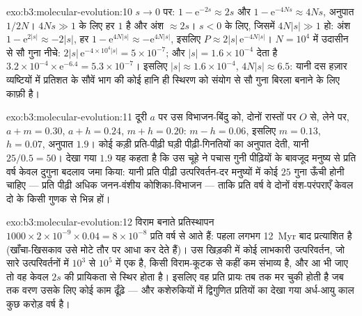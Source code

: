 \begin{solution}{exo:b3:molecular-evolution:10}
$s \to 0$ पर: $1 - \mathrm{e}^{-2s} \approx 2s$ और $1 - \mathrm{e}^{-4Ns}
\approx 4Ns$, अनुपात $1/2N$। $4Ns \gg 1$ के लिए हर $1$ है और
अंश $\approx 2s$। $s < 0$ के लिए, जिसमें $4N|s| \gg 1$ हो: अंश $1 -
\mathrm{e}^{2|s|} \approx -2|s|$, हर $1 - \mathrm{e}^{4N|s|} \approx
-\mathrm{e}^{4N|s|}$, इसलिए $P \approx 2|s|\,\mathrm{e}^{-4N|s|}$।
$N = 10^{4}$ में उदासीन से सौ गुना नीचे: $2|s|\,\mathrm{e}^{-4\times 10^{4}|s|} =
5\times 10^{-7}$; और $|s| = 1.6\times 10^{-4}$ देता है $3.2\times 10^{-4}\times
\mathrm{e}^{-6.4} = 5.3\times 10^{-7}$। इसलिए $|s| \approx 1.6\times 10^{-4}$,
$4N|s| \approx 6.5$: यानी दस हज़ार व्यष्टियों में प्रतिशत के सौवें भाग
की कोई हानि ही स्थिरण को संयोग से सौ गुना बिरला बनाने के लिए काफ़ी है।
\end{solution}

\begin{solution}{exo:b3:molecular-evolution:11}
दूरी $a$ पर उस विभाजन-बिंदु को, दोनों रास्तों पर $O$ से, लेने पर, $a + m =
0.30$, $a + h = 0.24$, $m + h = 0.20$: $m - h = 0.06$, इसलिए $m = 0.13$, $h
= 0.07$, अनुपात $1.9$। कोई कड़ी प्रति-पीढ़ी घड़ी पीढ़ी-गिनतियों का
अनुपात देती, यानी $25/0.5 = 50$। देखा गया $1.9$ यह कहता है कि उस चूहे ने
पचास गुनी पीढ़ियों के बावजूद मनुष्य से प्रति वर्ष केवल दुगुना बदलाव जमा
किया: यानी प्रति पीढ़ी उत्परिवर्तन-दर मनुष्यों में कोई $25$ गुना ऊँची
होनी चाहिए --- प्रति पीढ़ी अधिक जनन-वंशीय कोशिका-विभाजन --- ताकि प्रति
वर्ष वे दोनों वंश-परंपराएँ केवल दो के किसी गुणक से भिन्न हों।
\end{solution}

\begin{solution}{exo:b3:molecular-evolution:12}
विराम बनाते प्रतिस्थापन $1000\times 2\times 10^{-9}\times
0.04 = 8\times 10^{-8}$ प्रति वर्ष से आते हैं: पहला लगभग
\qty{12}{Myr} बाद प्रत्याशित है (खाँचा-खिसकाव उसे मोटे तौर पर आधा कर
देते हैं)। उस खिड़की में कोई लाभकारी उत्परिवर्तन, जो सारे
उत्परिवर्तनों में $10^{3}$ से $10^{5}$ में एक है, किसी विराम-कूटक से
कहीं कम संभाव्य है, और आ भी जाए तो वह केवल $2s$ की प्रायिकता से स्थिर
होता है। इसलिए वह प्रति प्रायः तब तक मर चुकी होती है जब तक वरण उसके लिए
कोई काम ढूँढ़े --- और कशेरुकियों में द्विगुणित प्रतियों का देखा गया
अर्ध-आयु काल कुछ करोड़ वर्ष है।
\end{solution}

